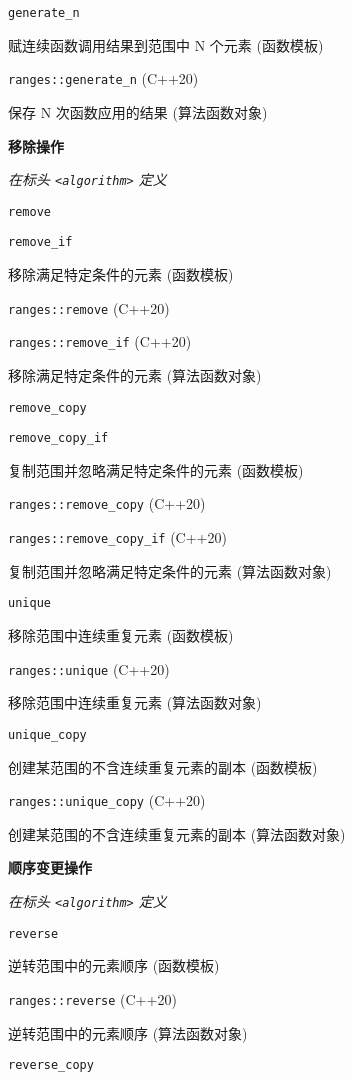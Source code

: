 \noindent \lstinline{generate_n}

赋连续函数调⽤结果到范围中 N 个元素 (函数模板)

\noindent \lstinline{ranges::generate_n} (C++20)

保存 N 次函数应⽤的结果 (算法函数对象)

\noindent \textbf{移除操作}

\textit{在标头 \lstinline{<algorithm>} 定义}


\noindent \lstinline{remove}

\noindent \lstinline{remove_if}

移除满⾜特定条件的元素 (函数模板)

\noindent \lstinline{ranges::remove} (C++20)

\noindent \lstinline{ranges::remove_if} (C++20)

移除满⾜特定条件的元素 (算法函数对象)

\noindent \lstinline{remove_copy}

\noindent \lstinline{remove_copy_if}

复制范围并忽略满⾜特定条件的元素 (函数模板)

\noindent \lstinline{ranges::remove_copy} (C++20)

\noindent \lstinline{ranges::remove_copy_if} (C++20)

复制范围并忽略满⾜特定条件的元素 (算法函数对象)

\noindent \lstinline{unique}

移除范围中连续重复元素 (函数模板)

\noindent \lstinline{ranges::unique} (C++20)

移除范围中连续重复元素 (算法函数对象)

\noindent \lstinline{unique_copy}

创建某范围的不含连续重复元素的副本 (函数模板)

\noindent \lstinline{ranges::unique_copy} (C++20)

创建某范围的不含连续重复元素的副本 (算法函数对象)


\noindent \textbf{顺序变更操作}

\textit{在标头 \lstinline{<algorithm>} 定义}


\noindent \lstinline{reverse}

逆转范围中的元素顺序 (函数模板)

\noindent \lstinline{ranges::reverse} (C++20)

逆转范围中的元素顺序 (算法函数对象)

\noindent \lstinline{reverse_copy} 

